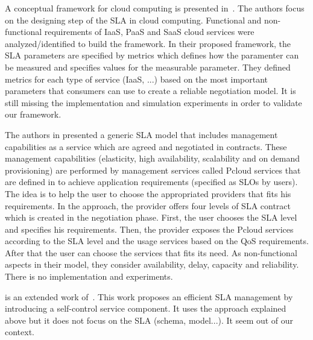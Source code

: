 \documentclass[12pt,a4paper,oneside]{book}
\begin{document}
\bigskip
A conceptual framework for cloud computing is presented in~\cite{005}. The authors focus on the designing step of the SLA in cloud computing. Functional and non-functional requirements of IaaS, PaaS and SaaS cloud services were analyzed/identified to build the framework. In their proposed framework, the SLA parameters are specified by metrics which defines how the paramenter can be measured and specifies values for the measurable parameter. They defined metrics for each type of service (IaaS, ...) based on the most important parameters that consumers can use to create a reliable negotiation model. It is still missing the implementation and simulation experiments in order to validate our framework.

\bigskip
The authors in \cite{009} presented a generic SLA model that includes management capabilities as a service which are agreed and negotiated in contracts. These management capabilities (elasticity, high availability, scalability and on demand provisioning) are performed by management services called Pcloud services that are defined in to achieve application requirements (specified as SLOs by users). The idea is to help the user to choose the appropriated providers that fits his requirements. In the approach, the provider offers four levels of SLA contract which is created in the negotiation phase. First, the user chooses the SLA level and specifies his requirements. Then, the provider exposes the Pcloud services according to the SLA level and the usage services based on the QoS requirements. After that the user can choose the services that fits its need. As non-functional aspects in their model, they consider availability, delay, capacity and reliability. There is no implementation and experiments.

\bigskip
\cite{008} is an extended work of~\cite{009}. This work proposes an efficient SLA management by introducing a self-control service component. It uses the approach explained above but it does not focus on the SLA (schema, model...). It seem out of our context.
\end{document}
